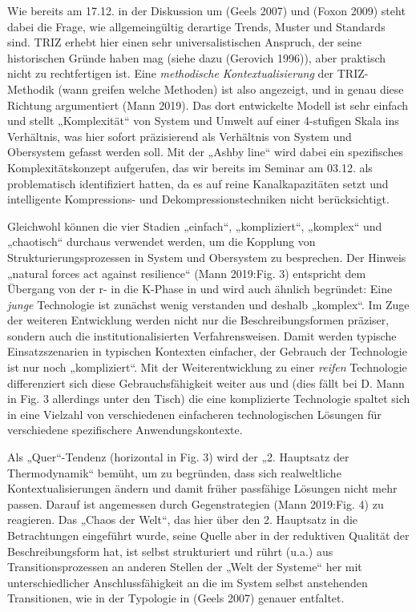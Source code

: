 \documentclass[11pt,a4paper]{article}
\begin{document}
Wie bereits am 17.12. in der Diskussion um (Geels 2007) und (Foxon 2009) steht
dabei die Frage, wie allgemeingültig derartige Trends, Muster und Standards
sind. TRIZ erhebt hier einen sehr universalistischen Anspruch, der seine
historischen Gründe haben mag (siehe dazu (Gerovich 1996)), aber praktisch
nicht zu rechtfertigen ist. Eine \emph{methodische Kontextualisierung} der
TRIZ-Methodik (wann greifen welche Methoden) ist also angezeigt, und in genau
diese Richtung argumentiert (Mann 2019).  Das dort entwickelte Modell ist sehr
einfach und stellt „Komplexität“ von System und Umwelt auf einer 4-stufigen
Skala ins Verhältnis, was hier sofort präzisierend als Verhältnis von System
und Obersystem gefasst werden soll. Mit der „Ashby line“ wird dabei ein
spezifisches Komplexitätskonzept aufgerufen, das wir bereits im Seminar am
03.12. als problematisch identifiziert hatten, da es auf reine
Kanalkapazitäten setzt und intelligente Kompressions- und
Dekompressionstechniken nicht berücksichtigt.

Gleichwohl können die vier Stadien „einfach“, „kompliziert“, „komplex“ und
„chaotisch“ durchaus verwendet werden, um die Kopplung von
Strukturierungsprozessen in System und Obersystem zu besprechen. Der Hinweis
„natural forces act against resilience“ (Mann 2019:Fig. 3) entspricht dem
Übergang von der r- in die K-Phase in \cite{Holling2000} und wird auch ähnlich
begründet: Eine \emph{junge} Technologie ist zunächst wenig verstanden und
deshalb „komplex“. Im Zuge der weiteren Entwicklung werden nicht nur die
Beschreibungsformen präziser, sondern auch die institutionalisierten
Verfahrensweisen. Damit werden typische Einsatzszenarien in typischen
Kontexten einfacher, der Gebrauch der Technologie ist nur noch „kompliziert“.
Mit der Weiterentwicklung zu einer \emph{reifen} Technologie differenziert
sich diese Gebrauchsfähigkeit weiter aus und (dies fällt bei D. Mann in Fig. 3
allerdings unter den Tisch) die eine komplizierte Technologie spaltet sich in
eine Vielzahl von verschiedenen einfacheren technologischen Lösungen für
verschiedene spezifischere Anwendungskontexte.

Als „Quer“-Tendenz (horizontal in Fig. 3) wird der „2. Hauptsatz der
Thermodynamik“ bemüht, um zu begründen, dass sich realweltliche
Kontextualisierungen ändern und damit früher passfähige Lösungen nicht mehr
passen.  Darauf ist angemessen durch Gegenstrategien (Mann 2019:Fig.  4) zu
reagieren. Das „Chaos der Welt“, das hier über den 2. Hauptsatz in die
Betrachtungen eingeführt wurde, seine Quelle aber in der reduktiven Qualität
der Beschreibungsform hat, ist selbst strukturiert und rührt (u.a.) aus
Transitionsprozessen an anderen Stellen der „Welt der Systeme“ her mit
unterschiedlicher Anschlussfähigkeit an die im System selbst anstehenden
Transitionen, wie in der Typologie in (Geels 2007) genauer entfaltet.
\end{document}
